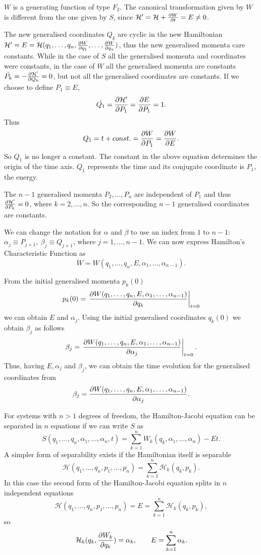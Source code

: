 \documentclass[../thesis.tex]{subfiles}
\theoremstyle{plain}
\begin{document}
\(W\) is a generating function of type \(F_2\). The canonical transformation given by \(W\)
is different from the one given by \(S\), since
\(\mathcal{H'} = \mathcal{H} + \pdv{W}{t} = E \neq 0\).

The new generalised coordinates \(Q_k\) are cyclic in the new Hamiltonian
\(\mathcal{H'} = E = \mathcal{H}(q_1,\dotsc,q_n,\pdv{W}{q_1},\dotsc,\pdv{W}{q_n})\),
thus the new generalised momenta care constants. While in the case of \(S\)
all the generalised momenta and coordinates were constants, in the case of \(W\)
all the generalised momenta are constants \(\dot{P_k}=-\pdv{\mathcal{H'}}{Q_k}=0\),
but not all the generalised coordinates are constants.
If we choose to define \(P_1 \equiv E\),
\[
  \dot{Q_1} = \pdv{\mathcal{H'}}{P_1} = \pdv{E}{P_1} = 1.
\]
Thus
\[
  Q_1 = t + const. = \pdv{W}{P_1} = \pdv{W}{E}.
\]
So \(Q_1\) is no longer a constant. The constant in the above equation determines the
origin of the time axis. \(Q_1\) represents the time and its conjugate coordinate is
\(P_1\), the energy.

The \(n-1\) generalised momenta \(P_2,\dotsc,P_n\) are independent of \(P_1\)
and thus \(\pdv{\mathcal{H'}}{P_k} = 0\), where \(k=2,\dotsc,n\). So the corresponding
\(n-1\) generalised coordinates are constants.

We can change the notation for \(\alpha \) and \(\beta \) to use an index from \(1\) to \(n-1\):
\(\alpha_j \equiv P_{j+1},\ \beta_j \equiv Q_{j+1}\), where \(j=1,\dotsc,n-1\).
We can now express Hamilton's Characteristic Function as
\[
  W=W(q_1,\dotsc,q_n,E,\alpha_1,\dotsc,\alpha_{n-1}).
\]

From the initial generalised momenta \(p_k(0)\)
\[
  p_k(0) = \eval{\pdv{W(q_1,\dotsc,q_n,E,\alpha_1,\dotsc,\alpha_{n-1})}{q_k}}_{t=0}
\]
we can obtain \(E\) and \(\alpha_j\). Using the initial generalised coordinates \(q_k(0)\)
we obtain \(\beta_j\) as follows
\[
  \beta_j = \eval{\pdv{W(q_1,\dotsc,q_n,E,\alpha_1,\dotsc,\alpha_{n-1})}{\alpha_j}}_{t=0}.
\]
Thus, having \(E, \alpha_j\) and \(\beta_j\), we can obtain the time evolution
for the generalised coordinates from
\[
  \beta_j = \pdv{W(q_1,\dotsc,q_n,E,\alpha_1,\dotsc,\alpha_{n-1})}{\alpha_j}.
\]

For systems with \(n>1\) degrees of freedom, the Hamilton-Jacobi equation can be separated in
\(n\) equations if we can write \(S\) as
\[
  S(q_1,\dotsc,q_n,\alpha_1,\dotsc,\alpha_n,t) = \sum_{k=1}^n W_k(q_k,\alpha_1,\dotsc,\alpha_n)-Et.
\]
A simpler form of separability exists if the Hamiltonian itself is separable
\[
  \mathcal{H}(q_1,\dotsc,q_n,p_1,\dotsc,p_n) = \sum_{k=1}^n \mathcal{H}_k(q_k,p_k).
\]
In this case the second form of the Hamilton-Jacobi equation splits in \(n\) independent equations
\[
  \mathcal{H}(q_1,\dotsc,q_n,p_1,\dotsc,p_n) = E = \sum_{k=1}^n \mathcal{H}_k(q_k,p_k),
\]
so
\[
  \mathcal{H}_k(q_k,\pdv{W_k}{q_k}) = \alpha_k,\qquad E = \sum_{k=1}^n \alpha_k.
\]
\end{document}
